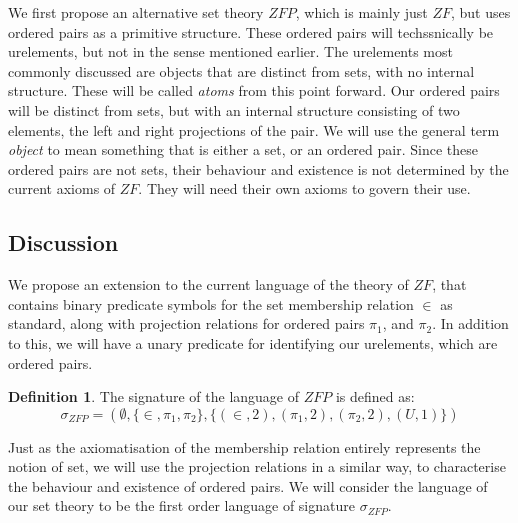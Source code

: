 \documentclass[11pt]{report}
\newcommand{\pleft}{\mathrel{\pi_1}}
\newcommand{\pright}{\mathrel{\pi_2}}
\theoremstyle{definition}
\theoremstyle{theorem}
\theoremstyle{lemma}
\newtheorem{definition}{Definition}[section]
\begin{document}
We first propose an alternative set theory $\mathit{ZFP}$, which is mainly just $\mathit{ZF}$, but uses ordered pairs as a primitive structure.
These ordered pairs will techssnically be urelements, but not in the sense mentioned earlier.
The urelements most commonly discussed are objects that are distinct from sets, with no internal structure.
These will be called \emph{atoms} from this point forward.
Our ordered pairs will be distinct from sets, but with an internal structure consisting of two elements, the left and right projections of the pair.
We will use the general term \emph{object} to mean something that is either a set, or an ordered pair.
Since these ordered pairs are not sets, their behaviour and existence is not determined by the current axioms of $\mathit{ZF}$.
They will need their own axioms to govern their use.

\subsection{Discussion}\label{zfpaxioms}
We propose an extension to the current language of the theory of $\mathit{ZF}$, that contains binary predicate symbols for the set membership relation $\in$ as standard, along with projection relations for ordered pairs $\pleft$, and $\pright$.
In addition to this, we will have a unary predicate for identifying our urelements, which are ordered pairs.
\begin{definition}
The signature of the language of $\mathit{ZFP}$ is defined as:
$$\sigma_\mathit{ZFP} = (\emptyset,\{\in, \pleft, \pright\},\{(\in,2),(\pleft,2),(\pright,2),(\mathit{U},1)\})$$
\end{definition}
\noindent
Just as the axiomatisation of the membership relation entirely represents the notion of set, we will use the projection relations in a similar way, to characterise the behaviour and existence of ordered pairs.
We will consider the language of our set theory to be the first order language of signature $\sigma_\mathit{ZFP}$.
\end{document}
